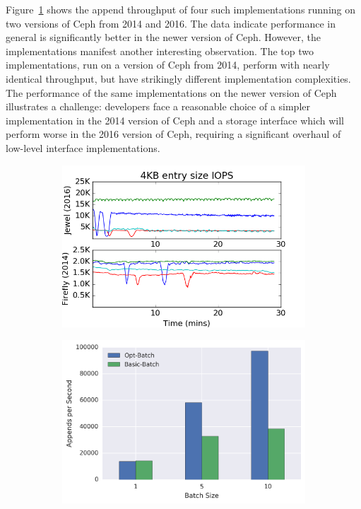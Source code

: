 Figure~\ref{fig:phy-design} shows the append throughput of four such
implementations running on two versions of Ceph from 2014 and 2016. The data indicate 
performance in general is significantly better in the newer version of Ceph. 
However, the implementations manifest another interesting observation. The top two
implementations, run on a version of Ceph from 2014, perform with nearly identical throughput, 
but have strikingly different implementation complexities. The performance of the same
implementations on the newer version of Ceph illustrates a challenge: developers face a
reasonable choice of a simpler implementation in the 2014 version of Ceph and a storage interface
which will perform worse in the 2016 version of Ceph, requiring a significant overhaul of low-level
interface implementations.

\begin{figure}[t]
    \centering
    \begin{subfigure}[b]{.30\linewidth}
        \centering
        \includegraphics[width=1.0\linewidth]{jewel_v_firefly_pd.png}
        \caption{}
        \label{fig:phy-design}
    \end{subfigure}
    \begin{subfigure}[b]{.30\linewidth}
        \centering
        \includegraphics[width=1.0\linewidth]{batching.png}

\end{subfigure}
\end{figure}
